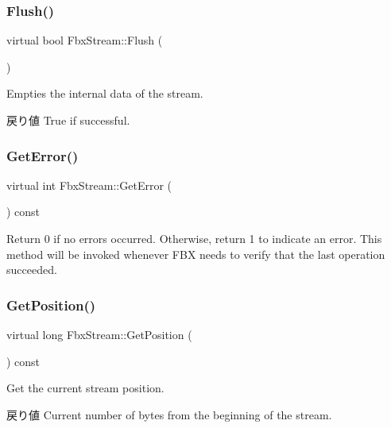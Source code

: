 \subsubsection{\texorpdfstring{Flush()}{Flush()}}
{\footnotesize\ttfamily virtual bool Fbx\+Stream\+::\+Flush (\begin{DoxyParamCaption}{ }\end{DoxyParamCaption})\hspace{0.3cm}{\ttfamily [pure virtual]}}

Empties the internal data of the stream. \begin{DoxyReturn}{戻り値}
True if successful. 
\end{DoxyReturn}
\mbox{\label{class_fbx_stream_adec0d602a55d05e923980e048b8d5b54}} 
\subsubsection{\texorpdfstring{Get\+Error()}{GetError()}}
{\footnotesize\ttfamily virtual int Fbx\+Stream\+::\+Get\+Error (\begin{DoxyParamCaption}{ }\end{DoxyParamCaption}) const\hspace{0.3cm}{\ttfamily [pure virtual]}}

Return 0 if no errors occurred. Otherwise, return 1 to indicate an error. This method will be invoked whenever F\+BX needs to verify that the last operation succeeded. \mbox{\label{class_fbx_stream_aa63da9f62321748910acaa808322a794}} 
\subsubsection{\texorpdfstring{Get\+Position()}{GetPosition()}}
{\footnotesize\ttfamily virtual long Fbx\+Stream\+::\+Get\+Position (\begin{DoxyParamCaption}{ }\end{DoxyParamCaption}) const\hspace{0.3cm}{\ttfamily [pure virtual]}}

Get the current stream position. \begin{DoxyReturn}{戻り値}
Current number of bytes from the beginning of the stream. 
\end{DoxyReturn}
\mbox{\label{class_fbx_stream_ae2a7513a648cde508d00f5172ba2843d}} 
